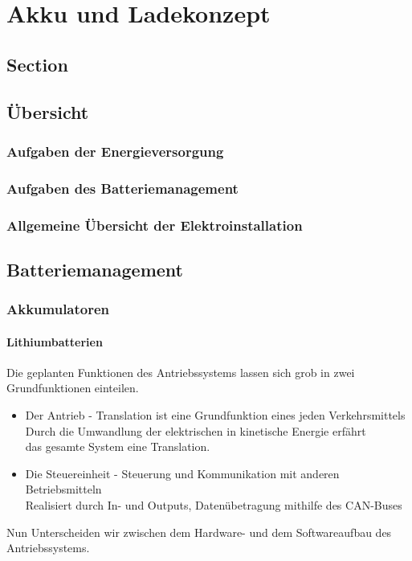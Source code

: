 \chapter{Akku und Ladekonzept}
\section{Section}

\section{Übersicht}


\subsection{Aufgaben der Energieversorgung}

\subsection{Aufgaben des Batteriemanagement}

\subsection{Allgemeine Übersicht der Elektroinstallation}

\section{Batteriemanagement}

\subsection{Akkumulatoren}
\subsubsection{Lithiumbatterien}
Die geplanten Funktionen des Antriebssystems lassen sich grob in zwei Grundfunktionen einteilen.

\begin{itemize}
	\item Der Antrieb - Translation ist eine Grundfunktion eines jeden Verkehrsmittels
	\\ Durch die Umwandlung der elektrischen in kinetische Energie erfährt 
	\\ das gesamte System eine Translation.
	\item Die Steuereinheit - Steuerung und Kommunikation mit anderen Betriebsmitteln
	\\ Realisiert durch In- und Outputs, Datenübetragung mithilfe des CAN-Buses 
\end{itemize}

Nun Unterscheiden wir zwischen dem Hardware- und dem Softwareaufbau des Antriebssystems.

\newpage